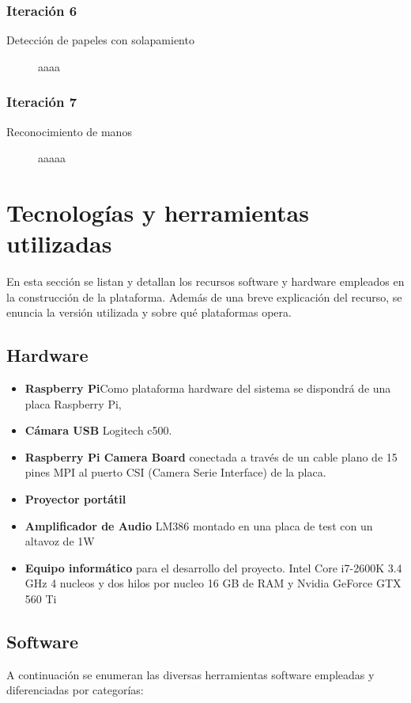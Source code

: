 \subsubsection{Iteración 6}
\begin{description}
\item [Detección de papeles con solapamiento] aaaa
\end{description}
\subsubsection{Iteración 7}
\begin{description}
\item [Reconocimiento de manos] aaaaa
\end{description}


\section{Tecnologías y herramientas utilizadas}

En esta sección se listan y detallan los recursos software y hardware empleados en la construcción de la plataforma. Además de una breve explicación del recurso, se enuncia la versión utilizada y sobre qué plataformas opera.

\subsection{Hardware}
\begin{itemize}
\item \textbf{Raspberry Pi}Como plataforma hardware del sistema se dispondrá de una placa Raspberry Pi, 
\item \textbf{Cámara USB} Logitech c500. 
\item \textbf{Raspberry Pi Camera Board} conectada a través de un cable plano de 15 pines MPI al puerto CSI (Camera Serie Interface) de la placa.
\item \textbf{Proyector portátil} 
\item \textbf{Amplificador de Audio} LM386 montado en una placa de test con un altavoz de 1W
\item \textbf{Equipo informático} para el desarrollo del proyecto. Intel Core i7-2600K 3.4 GHz 4 nucleos y dos hilos por nucleo 16 GB de RAM y Nvidia GeForce GTX 560 Ti

\end{itemize}

\subsection{Software}
A continuación se enumeran las diversas herramientas software empleadas y diferenciadas por categorías:

